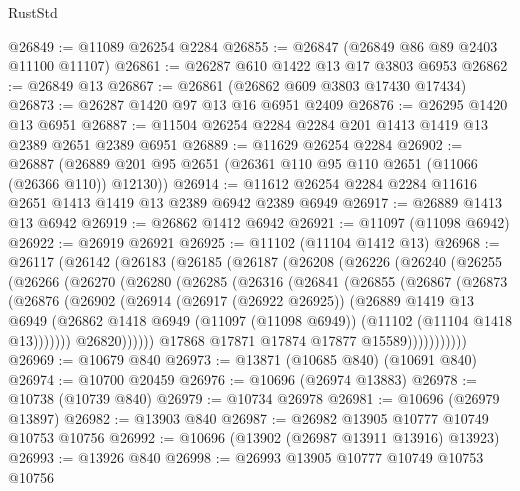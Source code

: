 \begin{lexlean}{RustStd}
\begin{coremodule}
@26849 := @11089 @26254 @2284
@26855 := @26847 (@26849 @86 @89 @2403 @11100 @11107)
@26861 := @26287 @610 @1422 @13 @17 @3803 @6953
@26862 := @26849 @13
@26867 := @26861 (@26862 @609 @3803 @17430 @17434)
@26873 := @26287 @1420 @97 @13 @16 @6951 @2409
@26876 := @26295 @1420 @13 @6951
@26887 := @11504 @26254 @2284 @2284 @201 @1413 @1419 @13 @2389 @2651 @2389 @6951
@26889 := @11629 @26254 @2284
@26902 := @26887 (@26889 @201 @95 @2651 (@26361 @110 @95 @110 @2651 (@11066 (@26366 @110)) @12130))
@26914 := @11612 @26254 @2284 @2284 @11616 @2651 @1413 @1419 @13 @2389 @6942 @2389 @6949
@26917 := @26889 @1413 @13 @6942
@26919 := @26862 @1412 @6942
@26921 := @11097 (@11098 @6942)
@26922 := @26919 @26921
@26925 := @11102 (@11104 @1412 @13)
@26968 := @26117
    (@26142
      (@26183
        (@26185
          (@26187
            (@26208
              (@26226
                (@26240
                  (@26255
                    (@26266
                      (@26270
                        (@26280
                          (@26285
                            (@26316
                              (@26841
                                (@26855
                                  (@26867
                                    (@26873
                                      (@26876
                                        (@26902
                                          (@26914
                                            (@26917 (@26922 @26925))
                                            (@26889
                                              @1419
                                              @13
                                              @6949
                                              (@26862
                                                @1418
                                                @6949
                                                (@11097 (@11098 @6949))
                                                (@11102 (@11104 @1418 @13)))))))
                                      @26820))))))
                          @17868
                          @17871
                          @17874
                          @17877
                          @15589)))))))))))
@26969 := @10679 @840
@26973 := @13871 (@10685 @840) (@10691 @840)
@26974 := @10700 @20459
@26976 := @10696 (@26974 @13883)
@26978 := @10738 (@10739 @840)
@26979 := @10734 @26978
@26981 := @10696 (@26979 @13897)
@26982 := @13903 @840
@26987 := @26982 @13905 @10777 @10749 @10753 @10756
@26992 := @10696 (@13902 (@26987 @13911 @13916) @13923)
@26993 := @13926 @840
@26998 := @26993 @13905 @10777 @10749 @10753 @10756

\end{coremodule}
\end{lexlean}
